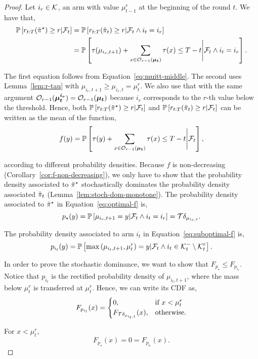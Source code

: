 \begin{proof}
Let $i_r\in \mathcal{K}$, an arm with value $\mu^r_{t-1}$ at the beginning of the round $t$. We have that,  
\begin{align}
\label{eq:optimal-f}
    \mathbb{P}\left[r_{t:T}(\Tilde{\pi}^\star) \geq r| \mathcal{F}_t \right] &= \mathbb{P}\left[r_{t:T}(\Tilde{\pi}_{t}) \geq r| \mathcal{F}_t \land i_t =i_r \right] \nonumber\\
    &= \mathbb{P}\left[\tau(\mu_{i_r, t+1}) +  \sum_{x \in \mathcal{O}_{r-1}(\boldsymbol{\mu_t})} \tau(x) \leq T - t \Bigg| \mathcal{F}_t \land i_t = i_r\right].
\end{align}

The first equation follows from Equation~\ref{eq:muitt-middle}. The second uses Lemma~\ref{lem:r-tau} with $\mu_{i_r,t+1} \geq \mu_{i_r, t} =\mu^{r}_{t}$. We also use that  with the same argument $\mathcal{O}_{r-1}(\boldsymbol{\mu_t}^{\boldsymbol{i_r}}) =\mathcal{O}_{r-1}(\boldsymbol{\mu_t})$ because $i_r$ corresponds to the $r$-th value below the threshold. Hence, both $\mathbb{P}\left[r_{t:T}(\Tilde{\pi}^\star) \geq r| \mathcal{F}_t\right]$ and $\mathbb{P}\left[r_{t:T}(\Tilde{\pi}_{t}) \geq r| \mathcal{F}_t\right]$ can be written as the mean of the function, 
\[
f(y) = \mathbb{P}\left[\tau(y) +  \sum_{x \in \mathcal{O}_{r-1}(\boldsymbol{\mu_t})} \tau(x) \leq T - t
\Bigg | \mathcal{F}_t \right], \]

according to different probability densities. Because $f$ is non-decreasing (Corollary~\ref{cor:f-non-decreasing}), we only have to show that the probability density associated to $\Tilde{\pi}^\star$ stochastically dominates the probability density associated $\Tilde{\pi}_{t}$ (Lemma~\ref{lem:stoch-dom-monotone}). The probability density associated to $\Tilde{\pi}^\star$ in Equation~\ref{eq:optimal-f} is,
\[
p_\star(y) =  \mathbb{P}\left[\mu_{i_r,t+1} = y | \mathcal{F}_t \land i_t = i_r \right] = \mathcal{T} \delta_{\mu_{i_r,t}}.
\]

The probability density associated to arm $i_t$ in 
Equation~\ref{eq:suboptimal-f} is,
\[
p_{i_t}(y) =  \mathbb{P}\left[\max\left(\mu_{i_t,t+1}, \mu^{r}_{t}\right) = y | \mathcal{F}_t \land i_t \in \mathcal{K}_t^- \setminus \mathcal{K}_t^r \right].
\]

In order to prove the stochastic dominance,  we want to show that $F_{p_\star} \leq  F_{p_{i_t}}$. Notice that $p_{i_t}$ is the rectified probability density of $\mu_{i_t,t+1}$, where the mass below $\mu^r_{t}$ is transferred at $\mu^r_{t}$. Hence, we can write its CDF as,
\begin{equation}
\label{eq:Fpit}
F_{p_{i_t}}(x) = \begin{cases}
      0, & \text{if}\ x < \mu^{r}_{t} \\
      F_{\mathcal{T}\delta_{\mu_{i_t,t}}}(x), & \text{otherwise}.
    \end{cases}
\end{equation}

For $x < \mu^r_{t}$, 
\begin{equation}
\label{eq:dominance-small-x}
F_{p_{\star}}(x) = 0 = F_{p_{i_t}}(x).
\end{equation}


\end{proof}
